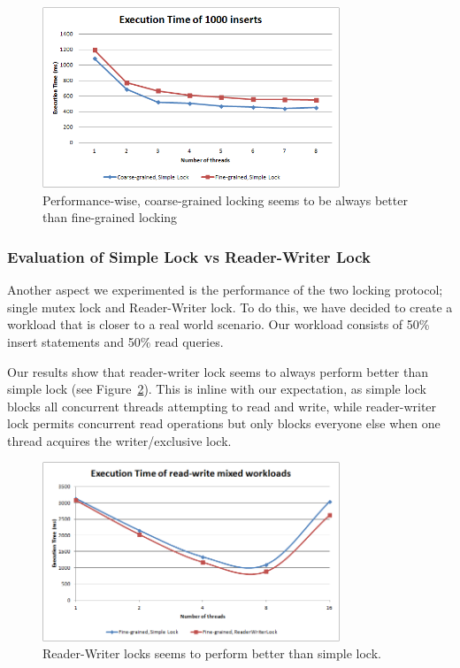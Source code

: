 \documentclass[11pt,journal,compsoc]{IEEEtran}
\begin{document}
\begin{figure}[!t]
\centering
\includegraphics[width=3.5in]{images/execution_thousand_inserts}
\caption{Performance-wise, coarse-grained locking seems to be always better than fine-grained locking}
\label{fig:thousand_inserts}
\end{figure}


\subsubsection{Evaluation of Simple Lock vs Reader-Writer Lock}
Another aspect we experimented is the performance of the two locking protocol; single mutex lock and Reader-Writer lock. To do this, we have decided to create a workload that is closer to a real world scenario. Our workload consists of 50\% insert statements and 50\% read queries.

Our results show that reader-writer lock seems to always perform better than simple lock (see Figure~\ref{fig:mixed_load}). This is inline with our expectation, as simple lock blocks all concurrent threads attempting to read and write, while reader-writer lock permits concurrent read operations but only blocks everyone else when one thread acquires the writer/exclusive lock.

\begin{figure}[!t]
\centering
\includegraphics[width=3.5in]{images/mixed_load}
\caption{Reader-Writer locks seems to perform better than simple lock.}
\label{fig:mixed_load}
\end{figure}
\end{document}
